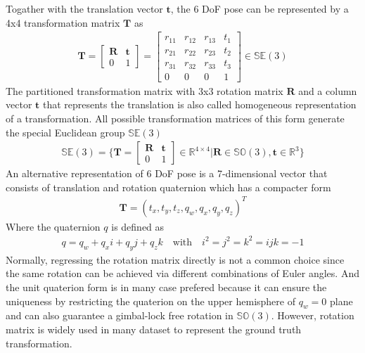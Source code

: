 \documentclass[12pt,DIV14,BCOR12mm,a4paper,footinclude=false,headinclude,parskip=half-,twoside,openright,cleardoublepage=empty,toc=index,bibliography=totoc,listof=totoc]{scrreprt}
\numberwithin{equation}{chapter}
\begin{document}
Togather with the translation vector $\textbf{t}$, the 6 DoF pose can be represented by a 4x4 transformation matrix $\textbf{T}$ as
\begin{align}
  \textbf{T} = \begin{bmatrix}
    \textbf{R} & \textbf{t} \\
    0 & 1
  \end{bmatrix}
  = \begin{bmatrix}
    r_{11} & r_{12} & r_{13} & t_{1} \\
    r_{21} & r_{22} & r_{23} & t_{2} \\
    r_{31} & r_{32} & r_{33} & t_{3} \\
    0 & 0 & 0 & 1
  \end{bmatrix}
  \in \mathbb{S} \mathbb{E} (3)
\end{align}
The partitioned transformation matrix with 3x3 rotation matrix $\textbf{R}$ and a column vector $\textbf{t}$ that represents the translation 
is also called homogeneous representation of a transformation. All possible transformation matrices of this form generate the 
special Euclidean group $\mathbb{S} \mathbb{E} (3)$
\begin{align}
  \mathbb{S} \mathbb{E} (3) = \{\textbf{T} = \begin{bmatrix}
    \textbf{R} & \textbf{t} \\
    0 & 1
  \end{bmatrix}\in \mathbb{R}^{4 \times 4}| \textbf{R} \in \mathbb{S} \mathbb{O} (3), \textbf{t} \in \mathbb{R}^{3} \}
\end{align}
An alternative representation of 6 DoF pose is a 7-dimensional vector that consists of translation and rotation quaternion which has a compacter form
\begin{align}
  \textbf{T} = (t_{x}, t_{y}, t_{z}, q_{w}, q_{x}, q_{y}, q_{z})^{T}
\end{align}
Where the quaternion $q$ is defined as
\begin{align}
  q = q_{w} + q_{x}i + q_{y}j + q_{z}k \quad \textrm{with} \quad i^{2} = j^{2} = k^{2} = ijk = -1
\end{align}
Normally, regressing the rotation matrix directly is not a common choice since the same rotation can be achieved via different combinations of Euler angles. 
And the unit quaterion form is in many case prefered because it can ensure the uniqueness by restricting the quaterion on the upper hemisphere of $q_{w}=0$ plane 
and can also guarantee a gimbal-lock free rotation in $\mathbb{S} \mathbb{O} (3)$\cite{9231126}. 
However, rotation matrix is widely used in many dataset to represent the ground truth transformation. 
\end{document}
